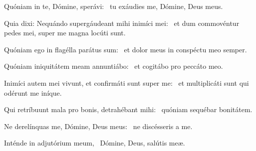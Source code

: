 \item Quóniam in te, Dómine, sperávi:~\psstar{} tu exáudies me, Dómine, Deus meus.

\item Quia dixi: Nequándo supergáudeant mihi inimíci mei:~\psstar{} et dum commovéntur pedes mei, super me magna locúti sunt.

\item Quóniam ego in flagélla parátus sum:~\psstar{} et dolor meus in conspéctu meo semper.

\item Quóniam iniquitátem meam annuntiábo:~\psstar{} et cogitábo pro peccáto meo.

\item Inimíci autem mei vivunt, et confirmáti sunt super me:~\psstar{} et multiplicáti sunt qui odérunt me iníque.

\item Qui retríbuunt mala pro bonis, detrahébant mihi:~\psstar{} quóniam sequébar bonitátem.

\item Ne derelínquas me, Dómine, Deus meus:~\psstar{} ne discésseris a me.

\item Inténde in adjutórium meum,~\psstar{} Dómine, Deus, salútis meæ.